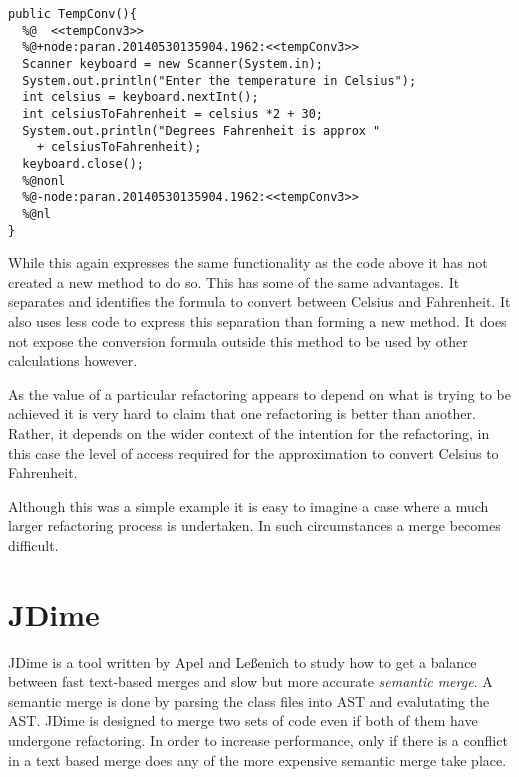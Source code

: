 \begin{minipage}[t]{1.0\textwidth}
\begin{lstlisting}
public TempConv(){
  %@  <<tempConv3>>
  %@+node:paran.20140530135904.1962:<<tempConv3>>
  Scanner keyboard = new Scanner(System.in);
  System.out.println("Enter the temperature in Celsius");
  int celsius = keyboard.nextInt();
  int celsiusToFahrenheit = celsius *2 + 30;
  System.out.println("Degrees Fahrenheit is approx " 
    + celsiusToFahrenheit);
  keyboard.close();
  %@nonl
  %@-node:paran.20140530135904.1962:<<tempConv3>>
  %@nl
}
\end{lstlisting}
\end{minipage}

While this again expresses the same functionality as the code above it has not created a new method to do so. This has some of the same advantages. It separates and identifies the formula to convert between Celsius and Fahrenheit. It also uses less code to express this separation than forming a new method. It does not expose the conversion formula outside this method to be used by other calculations however.

As the value of a particular refactoring appears to depend on what is trying to be achieved it is very hard to claim that one refactoring is better than another. Rather, it depends on the wider context of the intention for the refactoring, in this case the level of access required for the approximation to convert Celsius to Fahrenheit.

Although this was a simple example it is easy to imagine a case where a much larger refactoring process is undertaken. In such circumstances a merge becomes difficult. 

\section{JDime}
\label{sec:Jdime}
JDime is a tool written by  Apel and Le{\ss}enich \cite{Apel2012} \cite{Apel2011} \cite{LeBenich2012} to study how to get a balance between fast text-based merges and slow but more accurate \emph{semantic merge}.  
A semantic merge is done by parsing the class files into AST and evalutating the AST.
JDime is designed to merge two sets of code even if both of them have undergone refactoring. 
In order to increase performance, only if there is a conflict in a text based merge does any of the more expensive semantic merge take place. 

